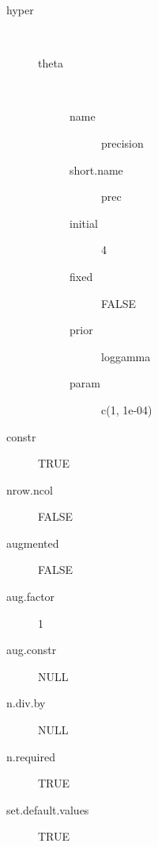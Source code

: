 \begin{description}
	\item[hyper]\ 
	 \begin{description}
	 	\item[theta]\ 
	 	 \begin{description}
	 	 	 \item[ name ] precision 
	 	 	 \item[ short.name ] prec 
	 	 	 \item[ initial ] 4 
	 	 	 \item[ fixed ] FALSE 
	 	 	 \item[ prior ] loggamma 
	 	 	 \item[ param ] c(1, 1e-04) 
	 	 \end{description}
	 \end{description}
	 \item[ constr ] TRUE 
	 \item[ nrow.ncol ] FALSE 
	 \item[ augmented ] FALSE 
	 \item[ aug.factor ] 1 
	 \item[ aug.constr ] NULL 
	 \item[ n.div.by ] NULL 
	 \item[ n.required ] TRUE 
	 \item[ set.default.values ] TRUE 
\end{description}

